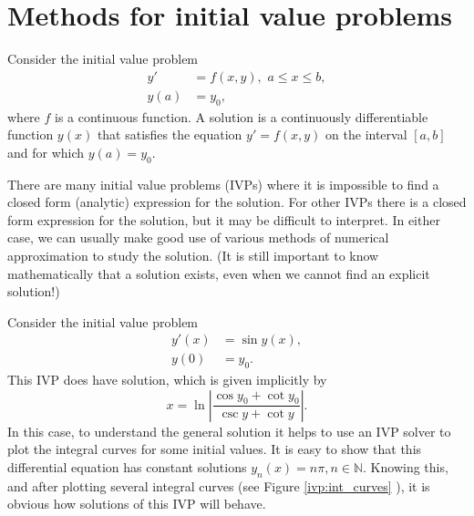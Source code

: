 \label{lab:IVP}


\section{Methods for initial value problems}
Consider the initial value problem 
\begin{align*}
y' &= f(x,y),\,\, a \leq x \leq b, \\
y(a) &= y_0,
\end{align*}
where $f$ is a continuous function. A solution is a continuously differentiable function $y(x)$ that satisfies the equation $y' = f(x,y)$ on the interval $[a,b]$ and for which $y(a) = y_0$.  

There are many initial value problems (IVPs) where it is impossible to find a closed form (analytic) expression for the solution. 
For other IVPs there is a closed form expression for the solution, but it may be difficult to interpret. 
In either case, we can usually make good use of various methods of numerical approximation to study the solution. (It is still important to know mathematically that a solution exists, even when we cannot find an explicit solution!)


Consider the initial value problem 
\begin{align*}
y'(x) &= \sin y(x), \\
y(0) &= y_0.
\end{align*}
This IVP does have solution, which is given implicitly by 
\[x = \ln \left|\frac{\cos y_0 + \cot y_0}{\csc y + \cot y} \right|.\]
In this case, to understand the general solution it helps to use an IVP solver to plot the integral curves for some initial values. It is easy to show that this differential equation has constant solutions $y_n(x) = n \pi, n \in \mathbb{N}$. Knowing this, and after plotting several integral curves (see Figure \ref{ivp:int_curves} ), it is obvious how solutions of this IVP will behave.


